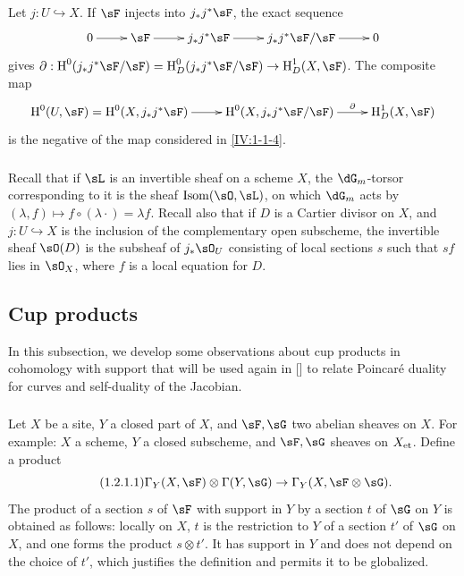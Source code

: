 Let $j:U\hookrightarrow X$. If $\sF$ injects into $j_* j^* \sF$, the exact
sequence
\[\xymatrix{
  0 \ar[r]
  & \sF \ar[r]
  & j_* j^* \sF \ar[r]
  & j_* j^* \sF / \sF \ar[r]
  & 0
}\]
gives
$\partial:\h^0(j_* j^*\sF/\sF) = \h_D^0(j_* j^* \sF/\sF) \to \h_D^1(X,\sF)$.
The composite map
\[\xymatrix{
  \h^0(U,\sF) = \h^0(X,j_* j^*\sF) \ar[r]
    & \h^0(X,j_* j^*\sF / \sF) \ar[r]^-\partial
    & \h_D^1(X,\sF)
}\]
is the negative of the map considered in \ref{IV:1-1-4}.






\subsubsection{}\label{IV:1-1-6}

Recall that if $\sL$ is an invertible sheaf on a scheme $X$, the
$\dG_m$-torsor corresponding to it is the sheaf
$\operatorname{Isom}(\sO,\sL)$, on which $\dG_m$ acts by
$(\lambda,f)\mapsto f\circ (\lambda\cdot) = \lambda f$. Recall also that if
$D$ is a Cartier divisor on $X$, and $j:U\hookrightarrow X$ is the inclusion
of the complementary open subscheme, the invertible sheaf $\sO(D)$ is the
subsheaf of $j_*\sO_U$ consisting of local sections $s$ such that $s f$ lies
in $\sO_X$, where $f$ is a local equation for $D$.











\subsection{Cup products}\label{IV:1-2}

In this subsection, we develop some observations about cup products in
cohomology with support that will be used again in [] to relate
Poincaré duality for curves and self-duality of the Jacobian.

\subsubsection{}\label{IV:1-2-1}

Let $X$ be a site, $Y$ a closed part of $X$, and $\sF,\sG$ two abelian
sheaves on $X$. For example: $X$ a scheme, $Y$ a closed subscheme, and
$\sF,\sG$ sheaves on ${X}_{\textnormal{et}}$. Define a product
\begin{equation*}\tag{1.2.1.1}\label{IV:eq:1-2-1-1}
  \Gamma_Y(X,\sF)\otimes \Gamma(Y,\sG) \to \Gamma_Y(X,\sF\otimes\sG) \text{.}
\end{equation*}
The product of a section $s$ of $\sF$ with support in $Y$ by a section $t$ of
$\sG$ on $Y$ is obtained as follows: locally on $X$, $t$ is the restriction
to $Y$ of a section $t'$ of $\sG$ on $X$, and one forms the product
$s\otimes t'$. It has support in $Y$ and does not depend on the choice of
$t'$, which justifies the definition and permits it to be globalized.

